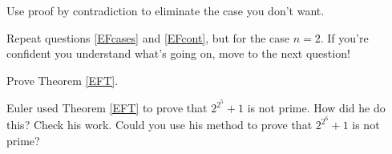 \documentclass[handout,nooutcomes]{ximera}
\begin{document}
\begin{question} \label{EFcont}
Use proof by contradiction to eliminate the case you don't want.
\end{question}

\begin{question}
Repeat questions \ref{EFcases} and \ref{EFcont}, but for the case $n=2$.  If you're 
confident you understand what's going on, move to the next question!
\end{question}

\begin{question}
Prove Theorem \ref{EFT}.
\end{question}

\begin{question}
Euler used Theorem \ref{EFT} to prove that $2^{2^5}+1$ is not prime.  How did he do this?  
Check his work.  Could you use his method to prove that $2^{2^6} +1$ is not prime?
\end{question}
\end{document}
